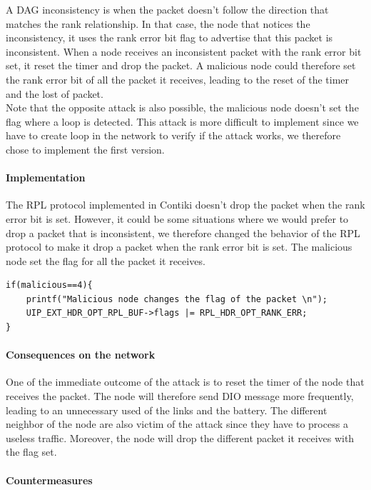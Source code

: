 \documentclass{report}
\begin{document}
A DAG inconsistency is when the packet doesn't follow the direction that
matches the rank relationship. In that case, the node that notices the
inconsistency, it uses the rank error bit flag to advertise that this
packet is inconsistent. When a node receives an inconsistent packet with
the rank error bit set, it reset the timer and drop the packet. A
malicious node could therefore set the rank error bit of all the packet
it receives, leading to the reset of the timer and the lost of packet.\\

Note that the opposite attack is also possible, the malicious node
doesn't set the flag where a loop is detected. This attack is more
difficult to implement since we have to create loop in the network to
verify if the attack works, we therefore chose to implement the first
version.

\paragraph{Implementation}
The \textsc{RPL} protocol implemented in Contiki doesn't drop the packet when
the rank error bit is set. However, it could be some situations where we would
prefer to drop a packet that is inconsistent, we therefore changed the behavior
of the \textsc{RPL} protocol to make it drop a packet when the rank error bit
is set. The malicious node set the flag for all the packet it receives.

\begin{lstlisting}[caption={DAG inconsistency attack 
done in the ext-header.c file }]
if(malicious==4){
	printf("Malicious node changes the flag of the packet \n");
	UIP_EXT_HDR_OPT_RPL_BUF->flags |= RPL_HDR_OPT_RANK_ERR;
}
\end{lstlisting}

\paragraph{Consequences on the network}
One of the immediate outcome of the attack is to reset the timer of the
node that receives the packet. The node will therefore send \textsc{DIO} message
more frequently, leading to an unnecessary used of the links and the
battery. The different neighbor of the node are also victim of the
attack since they have to process a useless traffic. Moreover, the node
will drop the different packet it receives with the flag set.

\paragraph{Countermeasures}
\end{document}
